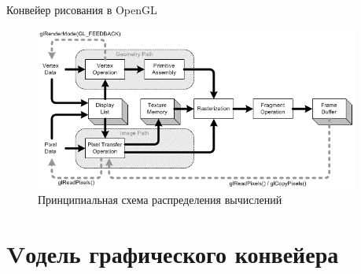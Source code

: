 \documentclass{beamer}
\begin{document}
\begin{frame}{Конвейер рисования в OpenGL}{}
	\begin{figure}
		\includegraphics[width=0.95\textwidth]{images/OpenGL_graphics_pipeline.png}
		\caption {Принципиальная схема распределения вычислений}
	\end{figure}
\end{frame}

\section{Vодель графического конвейера}
\end{document}
